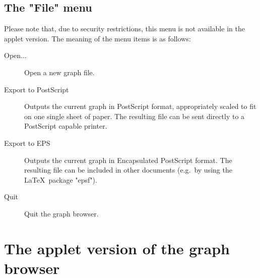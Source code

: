 \subsection*{The "File" menu}
Please note that, due to security restrictions, this menu is not available
in the applet version. The meaning of the menu items is as follows:
\begin{description}
\item[Open$\ldots$] Open a new graph file.
\item[Export to PostScript] Outputs the current graph in {\sc PostScript}
format, appropriately scaled to fit on one single sheet of paper.
The resulting file can be sent directly to a {\sc PostScript} capable printer.
\item[Export to EPS] Outputs the current graph in Encapsulated {\sc PostScript}
format. The resulting file can be included in other documents (e.g.~by using
the \LaTeX \ package "epsf").
\item[Quit] Quit the graph browser.
\end{description}

\section{The applet version of the graph browser}

